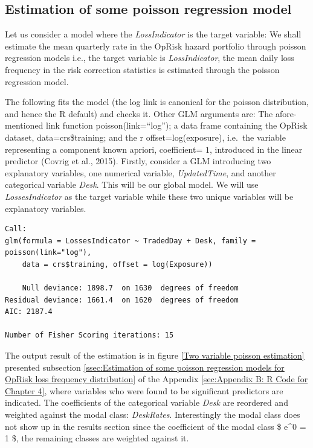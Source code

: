 \documentclass{DissertateUSU}
\begin{document}
\singlespacing

\doublespacing

\subsection{Estimation of some poisson regression model}
\label{ssec: Estimation of some poisson regression model}

Let us consider a model where the \emph{LossIndicator} is the target
variable: We shall estimate the mean quarterly rate in the OpRisk hazard
portfolio through poisson regression models i.e., the target variable is
\emph{LossIndicator}, the mean daily loss frequency in the risk
correction statistics is estimated through the poisson regression
model.\medskip

The following fits the model (the log link is canonical for the poisson
distribution, and hence the R default) and checks it. Other GLM
arguments are: The afore-mentioned link function poisson(link=``log'');
a data frame containing the OpRisk dataset, data=crs\$training; and the
r offset=log(exposure), i.e.~the variable representing a component known
apriori, coefficient= \(1\), introduced in the linear predictor (Covrig
et al., 2015). Firstly, consider a GLM introducing two explanatory
variables, one numerical variable, \emph{UpdatedTime}, and another
categorical variable \emph{Desk}. This will be our global model. We will
use \emph{LossesIndicator} as the target variable while these two unique
variables will be explanatory variables.

\singlespacing

\doublespacing

\singlespacing
\begin{verbatim}
Call:
glm(formula = LossesIndicator ~ TradedDay + Desk, family = poisson(link="log"), 
    data = crs$training, offset = log(Exposure))

    Null deviance: 1898.7  on 1630  degrees of freedom
Residual deviance: 1661.4  on 1620  degrees of freedom
AIC: 2187.4

Number of Fisher Scoring iterations: 15
\end{verbatim}
\doublespacing

The output result of the estimation is in figure
\ref{Two variable poisson estimation} presented subsection
\ref{ssec:Estimation of some poisson regression models for OpRisk loss frequency distribution}
of the Appendix \ref{sec:Appendix B: R Code for Chapter 4}, where
variables who were found to be significant predictors are indicated. The
coefficients of the categorical variable \emph{Desk} are reordered and
weighted against the modal class: \emph{DeskRates}. Interestingly the
modal class does not show up in the results section since the
coefficient of the modal class \$ e\^{}0 = 1 \$, the remaining classes
are weighted against it.
\end{document}
